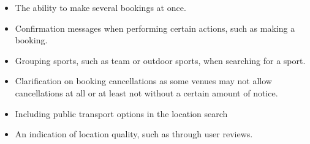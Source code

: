 \begin{itemize}
	\item The ability to make several bookings at once.
	\item Confirmation messages when performing certain actions, such as making a booking.
	\item Grouping sports, such as team or outdoor sports, when searching for a sport.
	\item Clarification on booking cancellations as some venues may not allow cancellations at all or at least not without a certain amount of notice.
	\item Including public transport options in the location search
	\item An indication of location quality, such as through user reviews.
\end{itemize}

